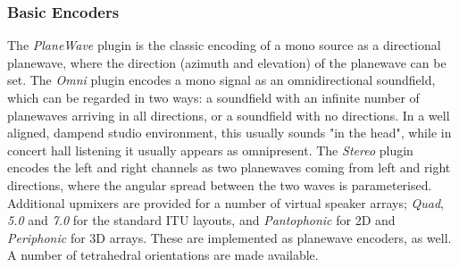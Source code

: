 \documentclass{article}
\begin{document}
%

\subsubsection{Basic Encoders}\label{sec:bas-encoders}
The \emph{PlaneWave} plugin is the classic encoding of a mono source as a directional plane\-wave, where the direction (azimuth and elevation) of the planewave can be set.
The \emph{Omni} plugin encodes a mono signal as an omnidirectional soundfield, which can be regarded in two ways:
a soundfield with an infinite number of plane\-waves arriving in all directions, or a soundfield with no directions. In a well aligned, dampend studio environment, this usually sounds "in the head", while in concert hall listening it usually appears as omnipresent. The \emph{Stereo} plugin encodes the left and right channels as two planewaves coming from left and right directions, where the angular spread between the two waves is parameterised. Additional upmixers are provided for a number of virtual spea\-ker arrays; \emph{Quad}, \emph{5.0} and \emph{7.0} for the standard ITU layouts, and \emph{Pantophonic} for 2D and \emph{Periphonic} for 3D arrays. These are implemented as planewave encoders, as well. A number of tetrahedral orientations are made available.
\end{document}
